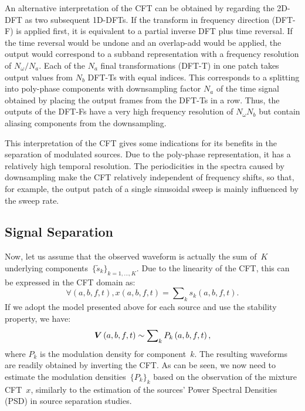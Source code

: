 An alternative interpretation of the CFT can be obtained by regarding the 2D-DFT
as two subsequent 1D-DFTs. If the transform in frequency direction (DFT-F) is
applied first, it is equivalent to a partial inverse DFT plus time reversal. If
the time reversal would be undone and an overlap-add would be applied, the
output would correspond to a subband representation with a frequency resolution
of $N_\omega / N_a$. Each of the $N_a$ final transformations (DFT-T) in one
patch takes output values from $N_b$ DFT-Ts with equal indices. This corresponds
to a splitting into poly-phase components with downsampling factor $N_a$ of the
time signal obtained by placing the output frames from the DFT-Ts in a row.
Thus, the outputs of the DFT-Fs have a very high frequency resolution of
$N_\omega N_b$ but contain aliasing components from the downsampling.
\par
This interpretation of the CFT gives some indications for its benefits in the
separation of modulated sources. Due to the poly-phase representation, it has a
relatively high temporal resolution. The periodicities in the spectra caused
by downsampling make the CFT relatively independent of frequency shifts, so
that, for example, the output patch of a single sinusoidal sweep is mainly
influenced by the sweep rate.

\subsection{Signal Separation}
Now, let us assume that the observed waveform is actually the sum
of~$K$ underlying components~$\{ \tilde{s}_{k}\} _{k=1,\dots,K}$.
Due to the linearity of the CFT, this can be
expressed in the CFT domain as:
$$
\forall\left(a,b,f,t\right),x\left(a,b,f,t\right)=\sum\nolimits_{k}s_{k}\left(a,b,f,t\right).
$$
If we adopt the model presented above for each source
and use the stability property, we have:
$$
{\bm{V}}\left(a,b,f,t\right)\sim \sum\nolimits_{k}P_{k}\left(a,b,f,t\right),
$$
where $P_{k}$ is the modulation density for component~$k$.
The resulting waveforms are readily obtained by inverting the CFT.\@
As can be seen, we now need to estimate the modulation
densities~$\{ P_{k}\}_{k}$ based on the observation
of the mixture CFT~$x$, similarly to the estimation of
 the sources' Power Spectral Densities (PSD)
in source separation studies.

